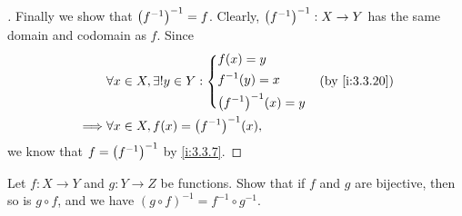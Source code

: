 \begin{proof}[]
  Finally we show that \(\left\lparen f^{-1}\right\rparen^{-1} = f\).
  Clearly, \(\left\lparen f^{-1}\right\rparen^{-1} : X \to Y\) has the same domain and codomain as \(f\).
  Since
  \begin{align*}
             & \forall x \in X, \exists! y \in Y : \begin{dcases}
                                                     f(x) = y      \\
                                                     f^{-1}(y) = x \\
                                                     \pa{f^{-1}}^{-1}(x) = y
                                                   \end{dcases} &  & \by{i:3.3.20} \\
    \implies & \forall x \in X, f(x) = \pa{f^{-1}}^{-1}(x),
  \end{align*}
  we know that \(f = \left\lparen f^{-1}\right\rparen^{-1}\) by \cref{i:3.3.7}.
\end{proof}

\begin{ex}\label{i:ex:3.3.7}
  Let \(f : X \to Y\) and \(g : Y \to Z\) be functions.
  Show that if \(f\) and \(g\) are bijective, then so is \(g \circ f\), and we have \((g \circ f)^{-1} = f^{-1} \circ g^{-1}\).
\end{ex}

